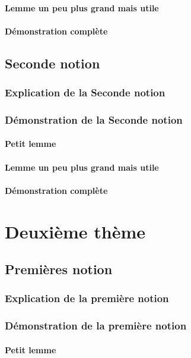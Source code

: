 \documentclass[a4paper,cours]{../texmf/tex/latex/insa/insa}
\begin{document}
				\subsection{Lemme un peu plus grand mais utile}
					\lipsum[1-4]
				\subsection{Démonstration complète}
					\lipsum[1-5]
		\chapter{Seconde notion}
			\lipsum[1-2]
			\section{Explication de la Seconde notion}
				\lipsum[1-5]
			\section{Démonstration de la Seconde notion}
				\subsection{Petit lemme}
					\lipsum[1-2]
				\subsection{Lemme un peu plus grand mais utile}
					\lipsum[1-4]
				\subsection{Démonstration complète}
					\lipsum[1-5]
	\part{Deuxième thème}
		\chapter{Premières notion}
				\lipsum[1-2]
			\section{Explication de la première notion}
				\lipsum[1-5]
			\section{Démonstration de la première notion}
				\subsection{Petit lemme}
					\lipsum[1-2]
\end{document}
